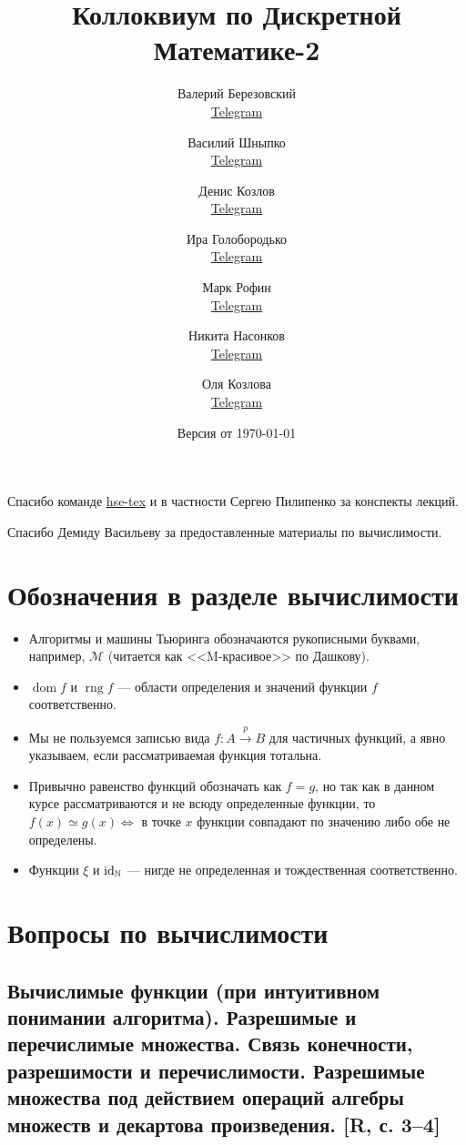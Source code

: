 \documentclass[a4paper, fleqn]{article}
\title{Коллоквиум по Дискретной Математике-2}
\author{

    Валерий Березовский  \\ \href{https://t.me/jeembogod}{Telegram} \and
    Василий Шныпко       \\ \href{https://t.me/yourvash}{Telegram} \and
    Денис Козлов         \\ \href{https://t.me/DKozl50}{Telegram} \and
    Ира Голобородько     \\ \href{https://t.me/Ira4kgl}{Telegram} \and
    Марк Рофин           \\ \href{https://t.me/Broccoliman}{Telegram} \and
    Никита Насонков      \\ \href{https://t.me/nnv_nick}{Telegram} \and
    Оля Козлова          \\ \href{https://t.me/grenlayk}{Telegram}
}
\date{Версия от {\ddmmyyyydate\today} \currenttime}
\DeclareMathOperator{\dom}{\mathop{\mathrm{dom}}}
\DeclareMathOperator{\rng}{\mathop{\mathrm{rng}}}
\begin{document}
    \maketitle

    Спасибо команде \href{https://github.com/hse-tex/hse-tex}{hse-tex} 
    и в частности Сергею Пилипенко за конспекты лекций. 

    Спасибо Демиду Васильеву за предоставленные материалы по вычислимости.

    \tableofcontents

    \newpage

\section{Обозначения в разделе вычислимости}

    \begin{itemize}
        \item Алгоритмы и машины Тьюринга обозначаются рукописными буквами, например, $\mathcal{M}$ (читается как <<M-красивое>> по Дашкову).

        \item $\dom f$ и $\rng f$ --- области определения и значений функции $f$ соответственно.

        \item Мы не пользуемся записью вида $f : A \xrightarrow{p} B$ для частичных функций, а явно указываем, если рассматриваемая функция тотальна.

        \item Привычно равенство функций обозначать как $f = g$, но так как в данном курсе рассматриваются и не всюду определенные функции, то $f(x) \simeq g(x) \iff$ в точке $x$ функции совпадают по значению либо обе не определены.

        \item Функции $\xi$ и $\text{id}_{\mathbb{N}}$ --- нигде не определенная и тождественная соответственно.
    \end{itemize}

\section{Вопросы по вычислимости}

    \subsection{Вычислимые функции (при интуитивном понимании алгоритма). Разрешимые и перечислимые множества. Связь конечности, разрешимости и перечислимости. Разрешимые множества под действием операций алгебры множеств и декартова произведения. [R, с. 3–4]}
\end{document}
